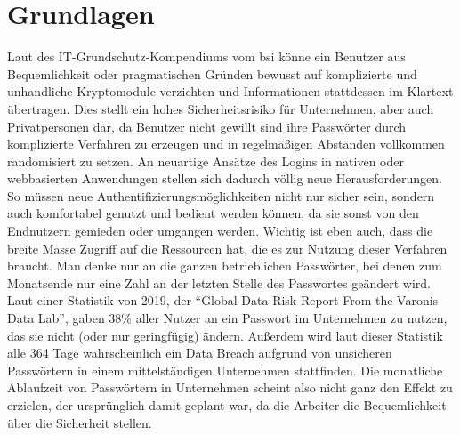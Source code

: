 \chapter{Grundlagen}
Laut des IT-Grundschutz-Kompendiums vom \ac{bsi} könne ein Benutzer aus Bequemlichkeit oder pragmatischen Gründen bewusst auf komplizierte und unhandliche Kryptomodule verzichten und Informationen stattdessen im Klartext übertragen. \cite{A1} Dies stellt ein hohes Sicherheitsrisiko für Unternehmen, aber auch Privatpersonen dar, da Benutzer nicht gewillt sind ihre Passwörter durch komplizierte Verfahren zu erzeugen und in regelmäßigen Abständen vollkommen randomisiert zu setzen. An neuartige Ansätze des Logins in nativen oder webbasierten Anwendungen stellen sich dadurch völlig neue Herausforderungen. So müssen neue Authentifizierungsmöglichkeiten nicht nur sicher sein, sondern auch komfortabel genutzt und bedient werden können, da sie sonst von den Endnutzern gemieden oder umgangen werden. Wichtig ist eben auch, dass die breite Masse Zugriff auf die Ressourcen hat, die es zur Nutzung dieser Verfahren braucht. Man denke nur an die ganzen betrieblichen Passwörter, bei denen zum Monatsende nur eine Zahl an der letzten Stelle des Passwortes geändert wird. Laut einer Statistik von 2019, der ``Global Data Risk Report From the Varonis Data Lab'', gaben 38\% aller Nutzer an ein Passwort im Unternehmen zu nutzen, das sie nicht (oder nur geringfügig) ändern. Außerdem wird laut dieser Statistik alle 364 Tage wahrscheinlich ein Data Breach aufgrund von unsicheren Passwörtern in einem mittelständigen Unternehmen stattfinden. Die monatliche Ablaufzeit von Passwörtern in Unternehmen scheint also nicht ganz den Effekt zu erzielen, der ursprünglich damit geplant war, da die Arbeiter die Bequemlichkeit über die Sicherheit stellen.

